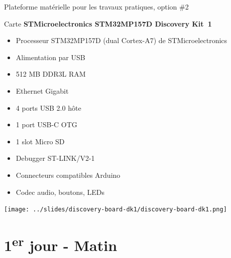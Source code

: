 \documentclass[a4paper,12pt,obeyspaces,spaces,hyphens]{article}
\begin{document}
\feagendatwocolumn
{Plateforme matérielle pour les travaux pratiques, option \#2}
{
  Carte {\bf STMicroelectronics STM32MP157D Discovery Kit~1}
  \begin{itemize}
  \item Processeur STM32MP157D (dual Cortex-A7) de STMicroelectronics
  \item Alimentation par USB
  \item 512 MB DDR3L RAM
  \item Ethernet Gigabit
  \item 4 ports USB 2.0 hôte
  \item 1 port USB-C OTG
  \item 1 slot Micro SD
  \item Debugger ST-LINK/V2-1
  \item Connecteurs compatibles Arduino
  \item Codec audio, boutons, LEDs
  \end{itemize}
}
{}
{
  \begin{center}
    \texttt{[image: ../slides/discovery-board-dk1/discovery-board-dk1.png]}
  \end{center}
}

\section{1\textsuperscript{er} jour - Matin}
\end{document}
